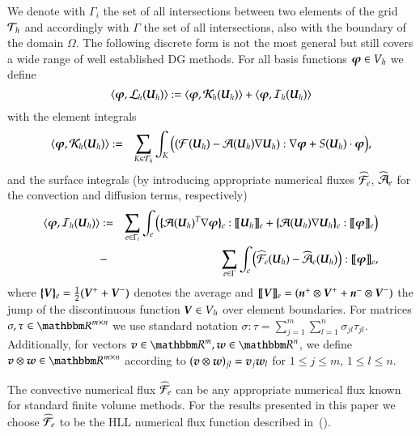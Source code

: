\newcommand{\dual}[1]{\langle \basefct, #1 \rangle}%
We denote with $\Gamma_i$ the set of all intersections between two 
elements of the grid ${\mathcal{T}_h}$ and accordingly with $\Gamma$ the set of all
intersections, also with the boundary of the domain $\Omega$. 
The following discrete form is not the most general but still
covers a wide range of well established DG methods. 
For all basis functions $\boldsymbol{\varphi} \in V_h$ we 
define 
\begin{equation}
\label{convDiscr}
\dual { \spcoper(\df) } := \dual{ \oper{K}_h(\df) } + \dual{ \oper{I}_h(\df) }
\end{equation}
with the element integrals  
\begin{eqnarray}
\label{eqn:elementint}
   \dual{ \oper{K}_h(\df) } &:=&
      \sum_{\elem \in \grid} \int_{\elem}
      \big( ( \mathcal{F}(\df) - \mathcal{A}(\vecU_h) \nabla \df ) : \nabla\basefct + \su
      \cdot \basefct \big),
\end{eqnarray}
and the surface integrals (by introducing appropriate numerical fluxes 
$\widehat{\mathcal{F}}_{e}$, $\widehat{\mathcal{A}}_{e}$ for the convection and diffusion terms, respectively) 
\begin{eqnarray}
\label{eqn:surfaceint}
   \dual{ \oper{I}_h(\df) } &:=&
      \sum_{e \in \Gamma_i} \int_e \big(
      \vaver{\mathcal{A}(\vecU_h)^T\nabla\basefct} : \vjump{\df} +
      \vaver{\mathcal{A}(\vecU_h)\nabla\df} : \vjump{\basefct} \big) \\
    &-& \sum_{e \in \Gamma} \int_e \big( \fluxF(\df) - \fluxA(\df)\big) :
      \vjump{\basefct},
      \nonumber 
\end{eqnarray}
where $\{ \! \! \{ { \boldsymbol{V} } \} \! \! \}_{e} = \frac{1}{2}( \boldsymbol{V}^+ + \boldsymbol{V}^- )$ denotes the average and 
$[ \! [ { \boldsymbol{V} } ] \! ]_{e} = (\boldsymbol{n}^+ \otimes \boldsymbol{V}^+  + \boldsymbol{n}^-\otimes \boldsymbol{V}^-) $ the jump of the
discontinuous function $\boldsymbol{V}\in V_h$ over element boundaries.
For matrices $\sigma,\tau\in\RRR^{m\times n}$ we use standard notation
$\sigma : \tau = \sum_{j=1}^m\sum_{l=1}^n\sigma_{jl}\tau_{jl}$. Additionally, for vectors
$\vecv \in \RRR^m,\vecw\in\RRR^n$, we define $\vecv\otimes\vecw\in\RRR^{m\times n}$
according to $(\boldsymbol{v}\otimes\boldsymbol{w})_{jl}=\boldsymbol{v}_j \boldsymbol{w}_l$ for $1\leq j\leq m$, $1\leq l\leq n$.

The convective numerical flux $\widehat{\mathcal{F}}_{e}$ can be any appropriate numerical flux known for
standard finite volume methods. 
For the results presented in this paper we choose $\widehat{\mathcal{F}}_{e}$ to be the 
HLL numerical flux function described in~(\cite{ChefBuch}).

